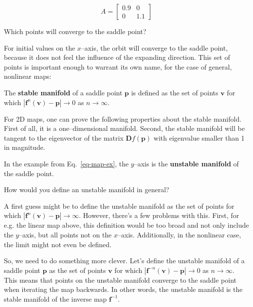 \begin{equation}
A =
\begin{bmatrix}
0.9 & 0 \\
0 & 1.1
\end{bmatrix} 
\label{eq-map-ex}
\end{equation} 

\begin{cue}
Which points will converge to the saddle point? 
\end{cue}

For initial values on the $x$--axis, the orbit will converge to the saddle point, because it does not feel the influence of the expanding direction. This set of points is important enough to warrant its own name, for the case of general, nonlinear maps:

The \textbf{stable manifold} of a saddle point ${\mathbf p}$ is defined as the set of points ${\mathbf v}$ for which $|{\mathbf f}^n({\mathbf v}) - {\mathbf p} | \to 0$ as $ n \to \infty$.

\noindent{}For 2D maps, one can prove the following properties about the stable manifold. First of all, it is a one--dimensional manifold. Second, the stable manifold will be tangent to the eigenvector of the matrix ${\mathbf Df}({\mathbf p})$ with eigenvalue smaller than 1 in magnitude.

In the example from Eq.~\ref{eq-map-ex}, the $y$--axis is the \textbf{unstable manifold} of the saddle point.

\begin{cue}
How would you define an unstable manifold in general?  
\end{cue}

A first guess might be to define the unstable manifold as the set of points for which $|{\mathbf f}^{n}({\mathbf v}) - {\mathbf p}| \to \infty$. However, there's a few problems with this. First, for e.g. the linear map above, this definition would be too broad and not only include the $y$--axis, but all points not on the $x$--axis. Additionally, in the nonlinear case, the limit might not even be defined.

So, we need to do something more clever. Let's define the unstable manifold of a saddle point ${\mathbf p}$ as the set of points ${\mathbf v}$ for which $|{\mathbf f}^{-n}({\mathbf v}) - {\mathbf p}| \to 0$ as $ n \to \infty$. This means that points on the unstable manifold converge to the saddle point when iterating the map backwards. In other words, the unstable manifold is the stable manifold of the inverse map ${\mathbf f}^{-1}$.

